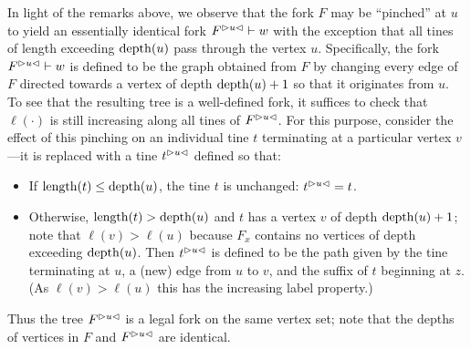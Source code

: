     In light of the remarks above, we observe that the fork $F$ may be
    ``pinched'' at $u$ to yield an essentially identical fork
    $\pinch{u}{F} \vdash w$ with the exception that all tines of length
    exceeding $\depth(u)$ pass through the vertex $u$. Specifically, the
    fork $\pinch{u}{F} \vdash w$ is defined to be the graph obtained
    from $F$ by changing every edge of $F$ directed towards a vertex of
    depth $\depth(u) + 1$ so that it originates from $u$. To see that
    the resulting tree is a well-defined fork, it suffices to check that
    $\ell(\cdot)$ is still increasing along all tines of
    $\pinch{u}{F}$. For this purpose, consider the effect of this
    pinching on an individual tine $t$ terminating at a particular
    vertex $v$---it is replaced with a tine $\pinch{u}{t}$ defined so
    that:
    \begin{itemize}
    \item If $\length(t) \leq \depth(u)$, the tine $t$ is unchanged:
      $\pinch{u}{t} = t$.
    \item Otherwise, $\length(t) > \depth(u)$ and $t$ has a vertex $v$
      of depth $\depth(u) + 1$; note that $\ell(v) > \ell(u)$ because
      $F_x$ contains no vertices of depth exceeding $\depth(u)$. Then
      $\pinch{u}{t}$ is defined to be the path given by the tine
      terminating at $u$, a (new) edge from $u$ to $v$, and the suffix
      of $t$ beginning at $z$. (As $\ell(v) > \ell(u)$ this has the
      increasing label property.)
    \end{itemize}
    Thus the tree $\pinch{u}{F}$ is a legal fork on the same vertex set;
    note that the depths of vertices in $F$ and $\pinch{u}{F}$ are
    identical.
    
